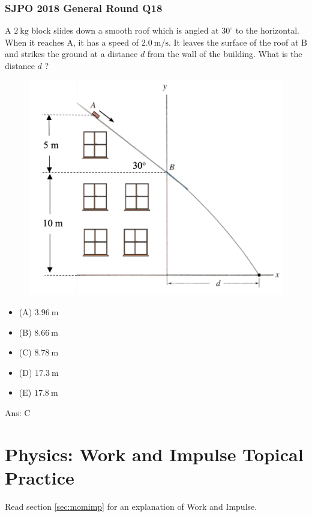 \documentclass{article}
\begin{document}
\begin{samepage}
\subsubsection{SJPO 2018 General Round Q18}
A $2 \mathrm{~kg}$ block slides down a smooth roof which is angled at $30^{\circ}$ to the horizontal. When it reaches $\mathrm{A}$, it has a speed of $2.0 \mathrm{~m} / \mathrm{s}$. It leaves the surface of the roof at $\mathrm{B}$ and strikes the ground at a distance $d$ from the wall of the building. What is the distance $d$ ?
{
 \begin{figure} 
\includegraphics[width=\linewidth]{images/2018q18.png}
\end{figure}
\begin{itemize}
\item[](A) $3.96 \mathrm{~m}$
\item[](B) $8.66 \mathrm{~m}$
\item[](C) $8.78 \mathrm{~m}$
\item[](D) $17.3 \mathrm{~m}$
\item[](E) $17.8 \mathrm{~m}$
\end{itemize}
}
Ans: \ifpaper C \fi \\[10pt]
\end{samepage}



\section{Physics: Work and Impulse Topical Practice}
Read section \ref{sec:momimp} for an explanation of Work and Impulse.
\end{document}
